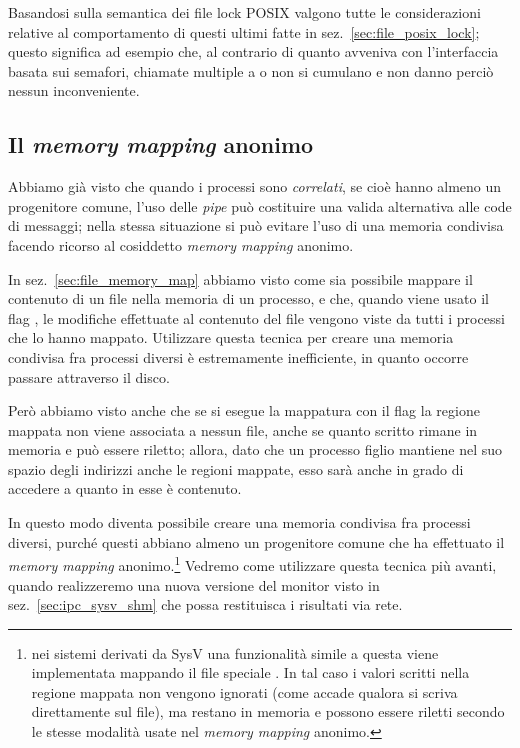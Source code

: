 Basandosi sulla semantica dei file lock POSIX valgono tutte le considerazioni
relative al comportamento di questi ultimi fatte in
sez.~\ref{sec:file_posix_lock}; questo significa ad esempio che, al contrario
di quanto avveniva con l'interfaccia basata sui semafori, chiamate multiple a
 o  non si cumulano e non danno perciò
nessun inconveniente.


\subsection{Il \textit{memory mapping} anonimo}
\label{sec:ipc_mmap_anonymous}


Abbiamo già visto che quando i processi sono \textsl{correlati}, se cioè hanno
almeno un progenitore comune, l'uso delle \textit{pipe} può costituire una
valida alternativa alle code di messaggi; nella stessa situazione si può
evitare l'uso di una memoria condivisa facendo ricorso al cosiddetto
\textit{memory mapping} anonimo.

In sez.~\ref{sec:file_memory_map} abbiamo visto come sia possibile mappare il
contenuto di un file nella memoria di un processo, e che, quando viene usato
il flag , le modifiche effettuate al contenuto del file
vengono viste da tutti i processi che lo hanno mappato. Utilizzare questa
tecnica per creare una memoria condivisa fra processi diversi è estremamente
inefficiente, in quanto occorre passare attraverso il disco. 

Però abbiamo visto anche che se si esegue la mappatura con il flag
 la regione mappata non viene associata a nessun file,
anche se quanto scritto rimane in memoria e può essere riletto; allora, dato
che un processo figlio mantiene nel suo spazio degli indirizzi anche le
regioni mappate, esso sarà anche in grado di accedere a quanto in esse è
contenuto.

In questo modo diventa possibile creare una memoria condivisa fra processi
diversi, purché questi abbiano almeno un progenitore comune che ha effettuato
il \textit{memory mapping} anonimo.\footnote{nei sistemi derivati da SysV una
  funzionalità simile a questa viene implementata mappando il file speciale
  . In tal caso i valori scritti nella regione mappata non
  vengono ignorati (come accade qualora si scriva direttamente sul file), ma
  restano in memoria e possono essere riletti secondo le stesse modalità usate
  nel \textit{memory mapping} anonimo.} Vedremo come utilizzare questa tecnica
più avanti, quando realizzeremo una nuova versione del monitor visto in
sez.~\ref{sec:ipc_sysv_shm} che possa restituisca i risultati via rete.

